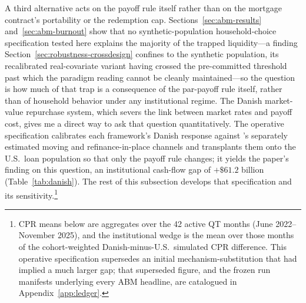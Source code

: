 \documentclass[12pt]{article}
\begin{document}
A third alternative acts on the payoff rule itself rather than on the mortgage contract's portability or the redemption cap. Sections~\ref{sec:abm-results} and~\ref{sec:abm-burnout} show that no synthetic-population household-choice specification tested here explains the majority of the trapped liquidity---a finding Section~\ref{sec:robustness-crossdesign} confines to the synthetic population, its recalibrated real-covariate variant having crossed the pre-committed threshold past which the paradigm reading cannot be cleanly maintained---so the question is how much of that trap is a consequence of the par-payoff rule itself, rather than of household behavior under any institutional regime. The Danish market-value repurchase system, which severs the link between market rates and payoff cost, gives me a direct way to ask that question quantitatively. The operative specification calibrates each framework's Danish response against \citet{berger2026}'s separately estimated moving and refinance-in-place channels and transplants them onto the U.S.\ loan population so that only the payoff rule changes; it yields the paper's finding on this question, an institutional cash-flow gap of $+\$61.2$ billion (Table~\ref{tab:danish}). The rest of this subsection develops that specification and its sensitivity.\footnote{\label{fn:manifest}CPR means below are aggregates over the 42 active QT months (June 2022--November 2025), and the institutional wedge is the mean over those months of the cohort-weighted Danish-minus-U.S.\ simulated CPR difference. This operative specification supersedes an initial mechanism-substitution that had implied a much larger gap; that superseded figure, and the frozen run manifests underlying every ABM headline, are catalogued in Appendix~\ref{app:ledger}.}
\end{document}
